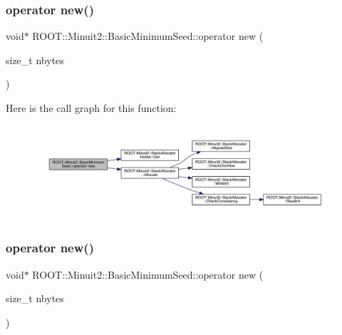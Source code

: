 \subsubsection{\texorpdfstring{operator new()}{operator new()}\hspace{0.1cm}{\footnotesize\ttfamily [2/3]}}
{\footnotesize\ttfamily void$\ast$ R\+O\+O\+T\+::\+Minuit2\+::\+Basic\+Minimum\+Seed\+::operator new (\begin{DoxyParamCaption}\item[{size\+\_\+t}]{nbytes }\end{DoxyParamCaption})\hspace{0.3cm}{\ttfamily [inline]}}

Here is the call graph for this function\+:
\nopagebreak
\begin{figure}[H]
\begin{center}
\leavevmode
\includegraphics[width=350pt]{de/d50/classROOT_1_1Minuit2_1_1BasicMinimumSeed_ae9ee17ec0140aa209e488b064675f3c3_cgraph}
\end{center}
\end{figure}
\mbox{\label{classROOT_1_1Minuit2_1_1BasicMinimumSeed_ae9ee17ec0140aa209e488b064675f3c3}} 
\subsubsection{\texorpdfstring{operator new()}{operator new()}\hspace{0.1cm}{\footnotesize\ttfamily [3/3]}}
{\footnotesize\ttfamily void$\ast$ R\+O\+O\+T\+::\+Minuit2\+::\+Basic\+Minimum\+Seed\+::operator new (\begin{DoxyParamCaption}\item[{size\+\_\+t}]{nbytes }\end{DoxyParamCaption})\hspace{0.3cm}{\ttfamily [inline]}}

